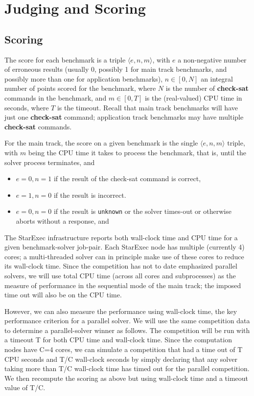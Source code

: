 \documentclass[12pt]{article}
\newcommand{\akey}[1]{\textbf{#1}}
\begin{document}
\section{Judging and Scoring}
\label{sec:judging}

\subsection{Scoring}

The score for each benchmark is a triple $\langle e,n,m\rangle$, with
$e$ a non-negative number of erroneous results (usually 0, possibly 1 for main track benchmarks, and possibly more than one for application benchmarks),
$n\in[0,N]$ an integral number of points scored for the benchmark,
where $N$ is the number of \akey{check-sat} commands
in the benchmark, and $m\in[0,T]$ is the (real-valued) CPU time in seconds, where $T$ is
the timeout.  Recall that main track benchmarks will have just one \akey{check-sat} command;
application track benchmarks may have multiple \akey{check-sat} commands.

For the main track, the score on a given benchmark is the single $\langle e,n,m\rangle$ triple, with $m$ being the CPU time it takes to process the benchmark, that is, until the solver process terminates, and
\begin{itemize}
\item $e=0, n=1$ if the result of the check-sat command is correct,
\item $e=1, n=0$ if the result is incorrect.
\item $e=0, n=0$ if the result is {\tt unknown} or the solver times-out or otherwise aborts without a response, and
\end{itemize}

The StarExec infrastructure reports both wall-clock time and CPU time for a given benchmark-solver job-pair. Each StarExec node has multiple (currently 4) cores; a multi-threaded solver can in principle make use of these cores to reduce its wall-clock time. Since the competition has not to date emphasized parallel solvers, we will use total CPU time (across all cores and subprocesses) as the measure of performance in the sequential mode of the main track; the imposed time out will also be on the CPU time.

However, we can also measure the performance using wall-clock time, the key performance criterion for a parallel solver.
We will use the same competition data to determine a parallel-solver winner as follows. The competition will be run with a timeout T for both CPU time and wall-clock time. Since the computation nodes have C=4 cores, we can simulate a competition that had a time out of T CPU seconds and T/C wall-clock seconds by simply declaring that any solver taking more than T/C wall-clock time has timed out for the parallel competition. We then recompute the scoring as above but using wall-clock time and a timeout value of T/C. 
\end{document}
